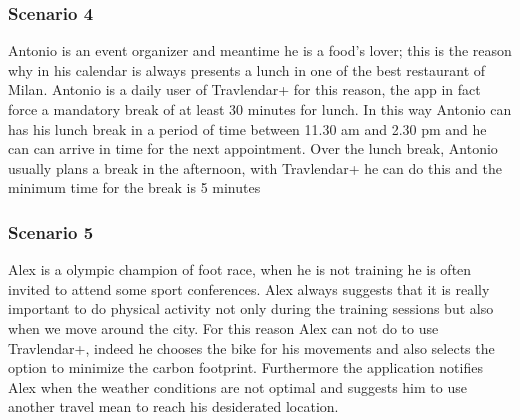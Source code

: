 \subsubsection{Scenario 4}
Antonio is an event organizer and meantime he is a food’s lover; this is the reason why in his calendar is always presents a lunch in one of the best restaurant of Milan. Antonio is a daily user of Travlendar+ for this reason, the app in fact force a mandatory break of at least 30 minutes for lunch. In this way Antonio can has his lunch break in a period of time between 11.30 am and 2.30 pm and he can can arrive in time for the next appointment. Over the lunch break, Antonio usually plans a break in the afternoon, with Travlendar+ he can do this and the minimum time for the break is 5 minutes

\subsubsection{Scenario 5}
Alex is a olympic champion of foot race, when he is not training he is often invited to attend some sport conferences. Alex always suggests that it is really important to do physical activity not only during the training sessions but also when we move around the city. For this reason Alex can not do to use Travlendar+, indeed he chooses the bike for his movements and also selects the option to minimize the carbon footprint. Furthermore the application notifies Alex when the weather conditions are not optimal and suggests him to use another travel mean to reach his desiderated location.
